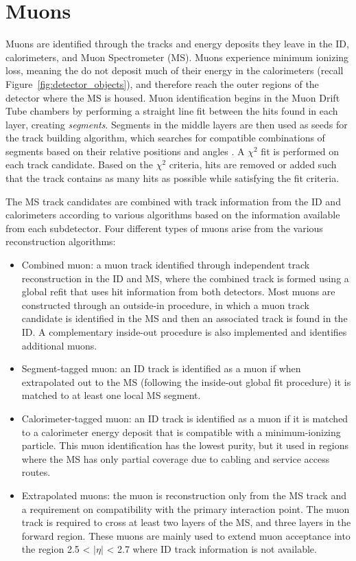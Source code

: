 \section{Muons}
Muons are identified through the tracks and energy deposits they leave in the ID, calorimeters, and Muon Spectrometer (MS). Muons experience minimum ionizing loss, meaning the do not deposit much of their energy in the calorimeters (recall Figure~\ref{fig:detector_objects}), and therefore reach the outer regions of the detector where the MS is housed. Muon identification begins in the Muon Drift Tube chambers by performing a straight line fit between the hits found in each layer, creating \textit{segments}. Segments in the middle layers are then used as seeds for the track building algorithm, which searches for compatible combinations of segments based on their relative positions and angles \cite{muon_reco}. A $\chi^2$ fit is performed on each track candidate. Based on the $\chi^2$ criteria, hits are removed or added such that the track contains as many hits as possible while satisfying the fit criteria. \par

The MS track candidates are combined with track information from the ID and calorimeters according to various algorithms based on the information available from each subdetector. Four different types of muons arise from the various reconstruction algorithms: 
\begin{itemize}
  \item Combined muon: a muon track identified through independent track reconstruction in the ID and MS, where the combined track is formed using a global refit that uses hit information from both detectors. Most muons are constructed through an outside-in procedure, in which a muon track candidate is identified in the MS and then an associated track is found in the ID. A complementary inside-out procedure is also implemented and identifies additional muons.
  \item Segment-tagged muon: an ID track is identified as a muon if when extrapolated out to the MS (following the inside-out global fit procedure) it is matched to at least one local MS segment. 
  \item Calorimeter-tagged muon: an ID track is identified as a muon if it is matched to a calorimeter energy deposit that is compatible with a minimum-ionizing particle. This muon identification has the lowest purity, but it used in regions where the MS has only partial coverage due to cabling and service access routes.
  \item Extrapolated muons:  the muon is reconstruction only from the MS track and a requirement on compatibility with the primary interaction point. The muon track is required to cross at least two layers of the MS, and three layers in the forward region. These muons are mainly used to extend muon acceptance into the region 2.5 < $|\eta|$ < 2.7 where ID track information is not available.
\end{itemize}

